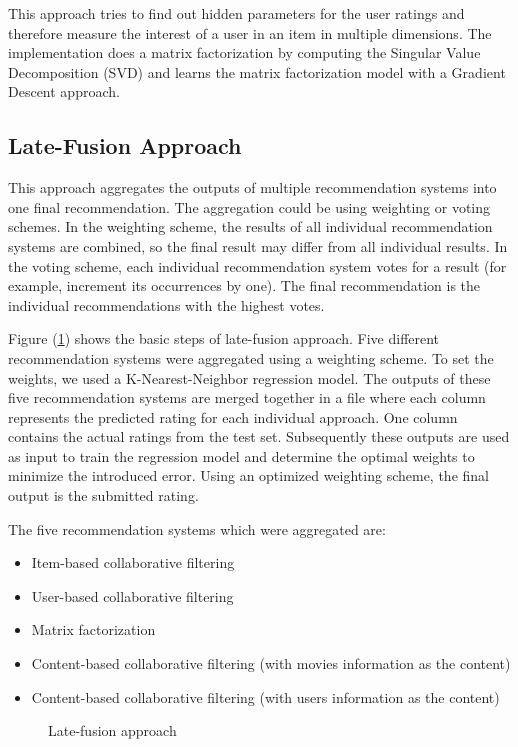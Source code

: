 \documentclass{sigish}
\begin{document}
This approach tries to find out hidden parameters for the user ratings and therefore measure the interest of a user in an item in multiple dimensions. The implementation does a matrix factorization by computing the Singular Value Decomposition (SVD) and learns the matrix factorization model with a Gradient Descent approach. 

\subsection{Late-Fusion Approach}

This approach aggregates the outputs of multiple recommendation systems into one final recommendation. The aggregation could be using weighting or voting schemes. In the weighting scheme, the results of all individual recommendation systems are combined, so the final result may differ from all individual results. In the voting scheme, each individual recommendation system votes for a result (for example, increment its occurrences by one). The final recommendation is the individual recommendations with the highest votes.

Figure (\ref{fig:late_fusion_approach}) shows the basic steps of late-fusion approach. Five different recommendation systems were aggregated using a weighting scheme. To set the weights, we used a K-Nearest-Neighbor regression model. The outputs of these five recommendation systems are merged together in a file where each column represents the predicted rating for each individual approach. One column contains the actual ratings from the test set. Subsequently these outputs are used as input to train the regression model and determine the optimal weights to minimize the introduced error. Using an optimized weighting scheme, the final output is the submitted rating.

The five recommendation systems which were aggregated are:
\begin{itemize}
	\item Item-based collaborative filtering
	\item User-based collaborative filtering
	\item Matrix factorization
	\item Content-based collaborative filtering (with movies information as the content)
	\item Content-based collaborative filtering (with users information as the content)
\end{itemize}

\begin{figure}
	\centering
	\caption{Late-fusion approach}
	\label{fig:late_fusion_approach}
\end{figure}
\end{document}
